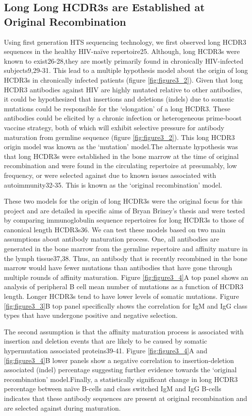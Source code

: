 \subsection{Long Long HCDR3s are Established at Original Recombination}
Using first generation HTS sequencing technology, we first observed long HCDR3 sequences in the healthy HIV-naïve repertoire25. Although, long HCDR3s were known to exist26-28,they are mostly primarily found in chronically HIV-infected subjects9,29-31. This lead to a multiple hypothesis model about the origin of long HCDR3s in chronically infected patients (figure \ref{fig:figure3_2}). Given that long HCDR3 antibodies against HIV are highly mutated relative to other antibodies, it could be hypothesized that insertions and deletions (indels) due to somatic mutations could be responsible for the ‘elongation’ of a long HCDR3. These antibodies could be elicited by a chronic infection or heterogeneous prime-boost vaccine strategy, both of which will exhibit selective pressure for antibody maturation from germline sequence (figure \ref{fig:figure3_2}). This long HCDR3 origin model was known as the ‘mutation’ model.The alternate hypothesis was that long HCDR3s were established in the bone marrow at the time of original recombination and were found in the circulating repertoire at presumably, low frequency, or were selected against due to known issues associated with autoimmunity32-35. This is known as the ‘original recombination’ model.

These two models for the origin of long HCDR3s were the original focus for this project and are detailed in specific aims of Bryan Briney’s thesis and were tested by comparing immunoglobulin sequence repertoires for long HCDR3s to those of canonical length HCDR3s36. We can test these models based on two main assumptions about antibody maturation process. One, all antibodies are generated in the bone marrow from the germline repertoire and affinity mature in the lymph tissue37,38. Thus, an antibody that is recently recombined in the bone marrow would have fewer mutations than antibodies that have gone through multiple rounds of affinity maturation.  Figure \ref{fig:figure3_4}A top panel shows an analysis of peripheral B cell mean number of mutations as a function of HCDR3 length. Longer HCDR3s tend to have lower levels of somatic mutations. Figure \ref{fig:figure3_3}B top panel specifically shows the correlation for IgM and IgG class types that have undergone positive and negative selection.

The second assumption is that the affinity maturation process is associated with insertion and deletion events that are likely to be caused by somatic hypermutation associated proteins39-41. Figure \ref{fig:figure3_4}A and \ref{fig:figure3_4}B lower panels show a negative correlation to insertion-deletion associated (indel) percentage suggesting further evidence towards the ‘original recombination’ model.Finally, a statistically significant change in long HCDR3 percentage between naïve B-cells and class switched IgM and IgG B-cells indicates that these antibody sequences are present at original recombination and are selected against during maturation.

